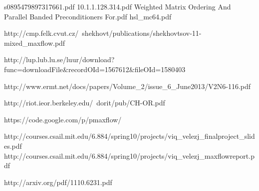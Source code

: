 s0895479897317661.pdf
10.1.1.128.314.pdf
Weighted Matrix Ordering And Parallel Banded Preconditioners For.pdf
hsl_mc64.pdf

http://cmp.felk.cvut.cz/~shekhovt/publications/shekhovtsov-11-mixed_maxflow.pdf

http://lup.lub.lu.se/luur/download?func=downloadFile&recordOId=1567612&fileOId=1580403

http://www.ermt.net/docs/papers/Volume_2/issue_6_June2013/V2N6-116.pdf

http://riot.ieor.berkeley.edu/~dorit/pub/CH-OR.pdf

https://code.google.com/p/pmaxflow/

http://courses.csail.mit.edu/6.884/spring10/projects/viq_velezj_finalproject_slides.pdf
http://courses.csail.mit.edu/6.884/spring10/projects/viq_velezj_maxflowreport.pdf

http://arxiv.org/pdf/1110.6231.pdf

